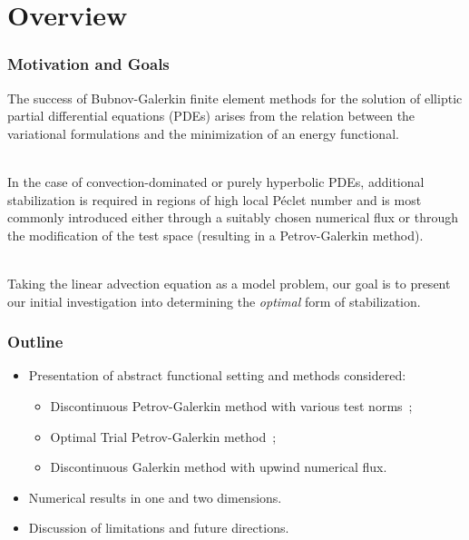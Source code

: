 \section{Overview}

\begin{frame}
\frametitle{Motivation and Goals}

The success of Bubnov-Galerkin finite element methods for the solution of
elliptic partial differential equations (PDEs) arises from the relation between
the variational formulations and the minimization of an energy functional.
\\~

In the case of convection-dominated or purely hyperbolic PDEs, additional
stabilization is required in regions of high local P\'eclet number and is most
commonly introduced either through a suitably chosen numerical flux or through
the modification of the test space (resulting in a Petrov-Galerkin method).
\\~

Taking the linear advection equation as a model problem, our goal is to present
our initial investigation into determining the \emph{optimal} form of
stabilization.

\end{frame}

\begin{frame}
\frametitle{Outline}

\begin{itemize}
\item Presentation of abstract functional setting and methods considered:
\begin{itemize}
\item Discontinuous Petrov-Galerkin method with various test norms~\cite{Demkowicz2011};
\item Optimal Trial Petrov-Galerkin method~\cite{Brunken2018};
\item Discontinuous Galerkin method with upwind numerical flux.
\end{itemize}
\item Numerical results in one and two dimensions.
\item Discussion of limitations and future directions.
\end{itemize}

\end{frame}